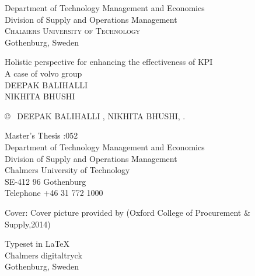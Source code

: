\begin{center}
	Department of Technology Management and Economics \\
	\emph{}{Division of Supply and Operations Management}\\
	\textsc{Chalmers University of Technology} \\
	Gothenburg, Sweden \the\year \\
\end{center}


\newpage
\thispagestyle{plain}
\vspace*{4.5cm}
Holistic perspective for enhancing the effectiveness of KPI\\
A case of volvo group\\
DEEPAK BALIHALLI\\
NIKHITA BHUSHI
 \setlength{\parskip}{1cm}

\copyright ~ DEEPAK BALIHALLI , NIKHITA BHUSHI, \the\year. \setlength{\parskip}{1cm}

Master's Thesis \the\year:052\\	%
Department of Technology Management and Economics\\
Division of Supply and Operations Management\\
Chalmers University of Technology\\
SE-412 96 Gothenburg\\
Telephone +46 31 772 1000 \setlength{\parskip}{0.5cm}

\vfill
Cover: Cover picture provided by (Oxford College of Procurement & Supply,2014) \setlength{\parskip}{0.5cm}

Typeset in \LaTeX \tagtemp\\
Chalmers digitaltryck\\
Gothenburg, Sweden \the\year

